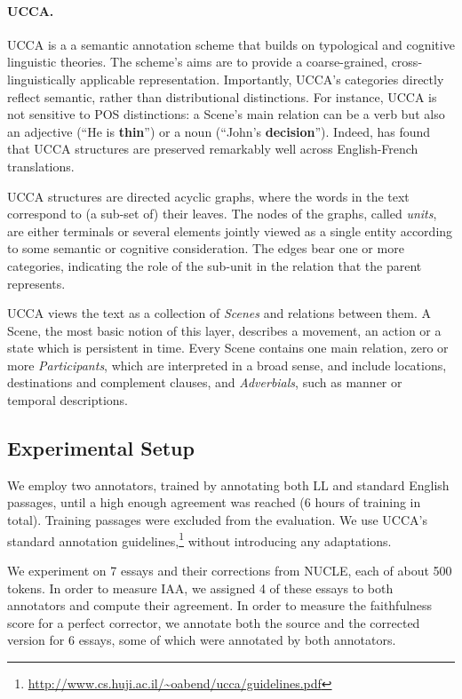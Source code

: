 \documentclass[letter,11pt]{article}
\begin{document}
\paragraph{UCCA.}\label{sec:ucca}
UCCA is a a semantic annotation scheme that builds on
typological and cognitive linguistic theories.
The scheme's aims are to provide a coarse-grained, cross-linguistically
applicable representation.
Importantly, UCCA's categories directly reflect semantic, rather than
distributional distinctions.
For instance, UCCA is not sensitive to POS distinctions:
a Scene's main relation can be a verb but also an adjective
(``He is {\bf thin}'') or a noun (``John's {\bf decision}'').
Indeed,  has found that UCCA structures are
preserved remarkably well across English-French translations. 

UCCA structures are directed acyclic graphs, where the words in the text 
correspond to (a sub-set of) their leaves.
The nodes of the graphs, called {\it units}, are either terminals or several elements jointly
viewed as a single entity according to some semantic or cognitive consideration.
The edges bear one or more categories, indicating the role of 
the sub-unit in the relation that the parent represents.

UCCA views the text as a collection of {\it Scenes} and relations between them.
A Scene, the most basic notion of this layer, describes a movement, 
an action or a state which is persistent in time.
Every Scene contains one main relation, 
zero or more {\it Participants}, 
which are interpreted in a broad sense, 
and include locations, destinations and complement clauses,
and {\it Adverbials}, such as manner or temporal descriptions.

\subsection{Experimental Setup}

We employ two annotators, trained by annotating both LL and standard English
passages, until a high enough agreement was reached (6 hours of training in total).
Training passages were excluded from the evaluation.
We use UCCA's standard annotation guidelines,\footnote{\url{http://www.cs.huji.ac.il/~oabend/ucca/guidelines.pdf}} without introducing any adaptations.

We experiment on 7 essays and their corrections from NUCLE, each of about 500 tokens.
In order to measure IAA, we assigned 4 of these essays to both annotators
and compute their agreement.
In order to measure the faithfulness score for a perfect corrector, we annotate both
the source and the corrected version for 6 essays, some of which were annotated by both annotators.
\end{document}
